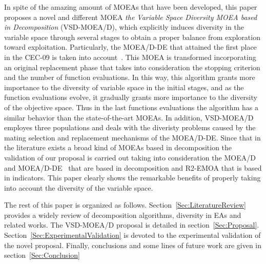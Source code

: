 In spite of the amazing amount of MOEAs that have been developed, this paper proposes a novel and different MOEA \textit{the Variable Space Diversity MOEA based in Decomposition} (VSD-MOEA/D), which explicitly induces diversity in the variable space through several stages to obtain a proper balance from exploration toward exploitation.
%
Particularly, the MOEA/D-DE that attained the first place in the CEC-09 is taken into account~\cite{zhang2009performance}.
%
This MOEA is transformed incorporating an original replacement phase that takes into consideration the stopping criterion and the number of function evaluations.
%
In this way, this algorithm grants more importance to the diversity of variable space in the initial stages, and as the function evaluations evolve, it gradually grants more importance to the diversity of the objective space.
%
Thus in the last functions evaluations the algorithm has a similar behavior than the state-of-the-art MOEAs.
%
In addition, VSD-MOEA/D employes three populations and deals with the diveristy problems caused by the mating selection and replacement mechanisms of the MOEA/D-DE.
%
Since that in the literature exists a broad kind of MOEAs based in decomposition the validation of our proposal is carried out taking into consideration the  MOEA/D~\cite{zhang2007moea} and  MOEA/D-DE~\cite{zhang2009performance} that are based in decomposition and R2-EMOA that is based in indicators.
%
This paper clearly shows the remarkable benefits of properly taking into account the diversity of the variable space.

The rest of this paper is organized as follows.
%
Section~\ref{Sec:LiteratureReview} provides a widely review of decomposition algorithms, diversity in EAs and related works.
%
The VSD-MOEA/D proposal is detailed in section~\ref{Sec:Proposal}.
%
Section~\ref{Sec:ExperimentalValidation} is devoted to the experimental validation of the novel proposal.
%
Finally, conclusions and some lines of future work are given in section~\ref{Sec:Conclusion}
%


